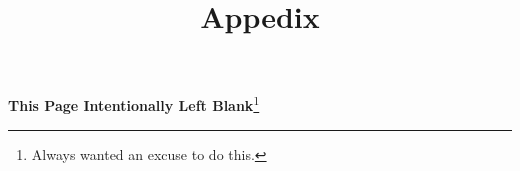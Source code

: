 









\label{lastPageOfExecSummary}

\newpage
\thispagestyle{empty}
\begin{center}
  \vspace*{\fill}
  {\Large \bfseries This Page Intentionally Left
    Blank}\footnote{Always wanted an excuse to do this.}
  \vspace*{\fill}
\end{center}
\newpage

\acresetall















\acresetall



\newpage
\appendix
\title{Appedix}
\date{}
\author{}
\subtitle{}
\titlenote{}
\maketitle
\acresetall



\newpage



\raggedright
\newpage


\newpage




